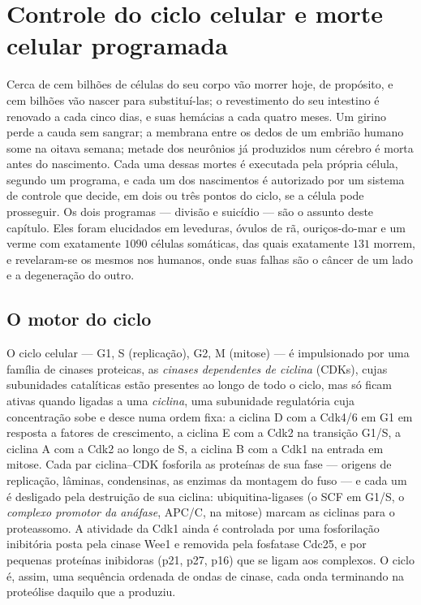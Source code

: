 \chapter{Controle do ciclo celular e morte celular programada}\label{ch:b3:cell-cycle-apoptosis}

Cerca de cem bilhões de células do seu corpo vão morrer hoje, de
propósito, e cem bilhões vão nascer para substituí-las; o revestimento
do seu intestino é renovado a cada cinco dias, e suas hemácias a cada
quatro meses. Um girino perde a cauda sem sangrar; a membrana entre os
dedos de um embrião humano some na oitava semana; metade dos neurônios
já produzidos num cérebro é morta antes do nascimento. Cada uma dessas
mortes é executada pela própria célula, segundo um programa, e cada um
dos nascimentos é autorizado por um sistema de controle que decide, em
dois ou três pontos do ciclo, se a célula pode prosseguir. Os dois
programas --- divisão e suicídio --- são o assunto deste capítulo. Eles
foram elucidados em leveduras, óvulos de rã, ouriços-do-mar e um verme
com exatamente $1090$ células somáticas, das quais exatamente $131$
morrem, e revelaram-se os mesmos nos humanos, onde suas falhas são o
câncer de um lado e a degeneração do outro.

\section{O motor do ciclo}

\begin{definition}\label{def:b3:cell-cycle-apoptosis:cdk}
O ciclo celular --- G1, S (replicação), G2, M (mitose) --- é
impulsionado por uma família de cinases proteicas, as \emph{cinases
dependentes de ciclina} (CDKs), cujas subunidades catalíticas estão
presentes ao longo de todo o ciclo, mas só ficam ativas quando ligadas
a uma \emph{ciclina}, uma subunidade regulatória cuja concentração sobe
e desce numa ordem fixa: a ciclina D com a Cdk4/6 em G1 em resposta a
fatores de crescimento, a ciclina E com a Cdk2 na transição G1/S, a
ciclina A com a Cdk2 ao longo de S, a ciclina B com a Cdk1 na entrada
em mitose. Cada par ciclina--CDK fosforila as proteínas de sua fase ---
origens de replicação, lâminas, condensinas, as enzimas da montagem do
fuso --- e cada um é desligado pela destruição de sua ciclina:
ubiquitina-ligases (o SCF em G1/S, o \emph{complexo promotor da
anáfase}, APC/C, na mitose) marcam as ciclinas para o proteassomo. A
atividade da Cdk1 ainda é controlada por uma fosforilação inibitória
posta pela cinase Wee1 e removida pela fosfatase Cdc25, e por pequenas
proteínas inibidoras (p21, p27, p16) que se ligam aos complexos. O
ciclo é, assim, uma sequência ordenada de ondas de cinase, cada onda
terminando na proteólise daquilo que a produziu.
\end{definition}

